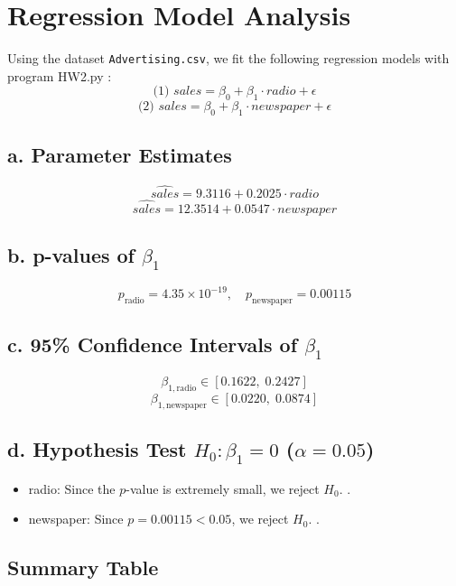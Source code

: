 \documentclass{article}
\begin{document}
\section*{Regression Model Analysis}

Using the dataset \texttt{Advertising.csv}, we fit the following regression models with program HW2.py :
\[
\text{(1) } sales = \beta_0 + \beta_1 \cdot radio + \epsilon
\]
\[
\text{(2) } sales = \beta_0 + \beta_1 \cdot newspaper + \epsilon
\]

\subsection*{a. Parameter Estimates}
\[
\hat{sales} = 9.3116 + 0.2025 \cdot radio
\]
\[
\hat{sales} = 12.3514 + 0.0547 \cdot newspaper
\]

\subsection*{b. p-values of $\beta_1$}
\[
p_{\text{radio}} = 4.35 \times 10^{-19}, 
\quad
p_{\text{newspaper}} = 0.00115
\]

\subsection*{c. 95\% Confidence Intervals of $\beta_1$}
\[
\beta_{1,\text{radio}} \in [0.1622, \; 0.2427]
\]
\[
\beta_{1,\text{newspaper}} \in [0.0220, \; 0.0874]
\]

\subsection*{d. Hypothesis Test $H_0: \beta_1 = 0$ ($\alpha{} = 0.05$)}
\begin{itemize}
    \item radio: Since the $p$-value is extremely small, we reject $H_0$. .
    \item newspaper: Since $p = 0.00115 < 0.05$, we reject $H_0$. .
\end{itemize}

\subsection*{Summary Table}
\end{document}
